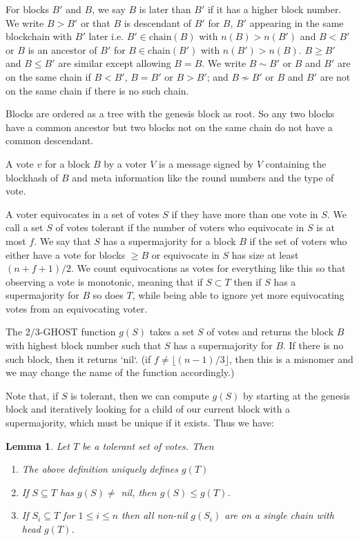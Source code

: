 \documentclass{article}
\newtheorem{lemma}[theorem]{Lemma}
\begin{document}
For blocks $B'$ and $B$, we say $B$ is later than $B'$ if it has a higher block number.
We write $B > B'$ or that $B$ is descendant of $B'$ for $B$, $B'$ appearing in the same blockchain with $B'$ later i.e. $B' \in \mathrm{chain}(B)$ with $n(B) > n(B')$ and $B < B'$ or $B$ is an ancestor of $B'$ for $B \in \mathrm{chain}(B')$ with $n(B') > n(B)$.
$B \geq B'$ and $B \leq B'$ are similar except allowing $B = B$.
We write $B \sim B'$ or $B$ and $B'$ are on the same chain if $B<B'$, $B=B'$ or $B> B'$; and $B \nsim B'$ or $B$ and $B'$ are not on the same chain if there is no such chain.

Blocks are ordered as a tree with the genesis block as root. So any two blocks have a common ancestor but two blocks not on the same chain do not have a common descendant.

A vote $v$ for a block $B$ by a voter $V$ is a message signed by $V$ containing the blockhash of $B$ and meta information like the round numbers and the type of vote. 



A voter equivocates in a set of votes $S$ if they have more than one vote in $S$. We call a set $S$ of votes tolerant if the number of voters who equivocate in $S$ is at most $f$. We say that $S$ has a supermajority for a block $B$ if the set of voters who either have a vote for blocks $\geq B$ or equivocate in $S$ has size at least $(n+f+1)/2$.  We count equivocations as votes for everything like this so that observing a vote is monotonic, meaning that if $S \subset T$ then if $S$ has a supermajority for $B$ so does $T$, while being able to ignore yet more equivocating votes from an equivocating voter.

The $2/3$-GHOST function $g(S)$ takes a set $S$ of votes and returns the block $B$ with highest block number such that $S$ has a supermajority for $B$.
If there is no such block, then it returns `nil`. (if $f \neq \lfloor (n-1)/3 \rfloor$, then this is a misnomer and we may change the name of the function accordingly.)

Note that, if $S$ is tolerant, then we can compute $g(S)$ by starting at the genesis block and iteratively looking for a child of our current block with a supermajority, which must be unique if it exists. Thus we have:
\begin{lemma} \label{lem:ghost-monotonicity}
Let $T$ be a tolerant set of votes. Then
\begin{enumerate}
\item The above definition uniquely defines $g(T)$
\item If $S \subseteq T$ has $g(S) \neq$ nil, then $g(S) \leq g(T)$.
\item If $S_i \subseteq T$ for $1 \leq i \leq n$ then all non-nil $g(S_i)$ are on a single chain with head $g(T)$.
\end{enumerate}

\end{lemma}
\end{document}
